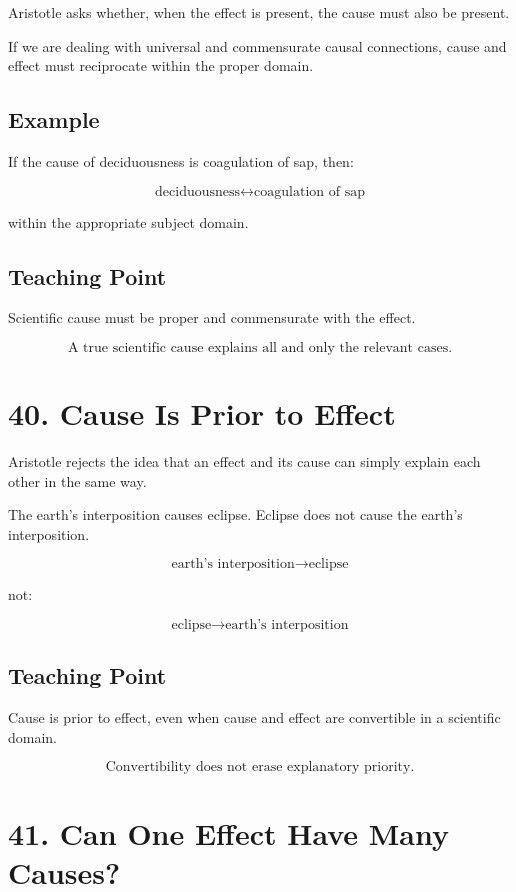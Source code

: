 \documentclass[12pt]{article}
\begin{document}
Aristotle asks whether, when the effect is present, the cause must also be
present.

If we are dealing with universal and commensurate causal connections, cause and
effect must reciprocate within the proper domain.

\subsection*{Example}

If the cause of deciduousness is coagulation of sap, then:

\[
\text{deciduousness} \leftrightarrow \text{coagulation of sap}
\]

within the appropriate subject domain.

\subsection*{Teaching Point}

Scientific cause must be proper and commensurate with the effect.

\[
\boxed{
\text{A true scientific cause explains all and only the relevant cases.}
}
\]

\section*{40. Cause Is Prior to Effect}

Aristotle rejects the idea that an effect and its cause can simply explain each
other in the same way.

The earth's interposition causes eclipse. Eclipse does not cause the earth's
interposition.

\[
\text{earth's interposition} \rightarrow \text{eclipse}
\]

not:

\[
\text{eclipse} \rightarrow \text{earth's interposition}
\]

\subsection*{Teaching Point}

Cause is prior to effect, even when cause and effect are convertible in a
scientific domain.

\[
\boxed{
\text{Convertibility does not erase explanatory priority.}
}
\]

\section*{41. Can One Effect Have Many Causes?}
\end{document}
